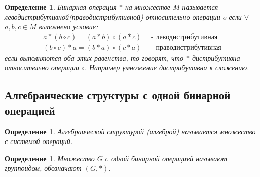 \documentclass[12pt,oneside]{article}
\newtheorem{determ}[theorem]{Определение}
\theoremstyle{definition}
\begin{document}
\begin{determ}
	Бинарная операция $*$ на множестве $M$ называется леводистрибутивной(праводистрибутивной) относительно операции $o$ если $\forall$ $a,b,c \in M$ выполнено условие:
	\begin{gather}
	a*(b \circ c) = (a*b)\circ(a*c) \quad\mbox{ - леводистрибутивная}\\
	(b \circ c)*a = (b*a)\circ(c*a) \quad\mbox{ - праводистрибутивная}
	\end{gather}
	если выполняются оба этих равенства, то говорят, что $*$ дистрибутивна относительно операции $\circ$. Например умножение дистрибутивна к сложению.
\end{determ}













































\subsection{Алгебраические структуры с одной бинарной операцией}
\begin{determ}
	Алгебраической структурой (алгеброй) называется множество с системой операций.
\end{determ}

\begin{determ}
	Множество $G$ с одной бинарной операцией называют группоидом, обозначают $(G,*)$.
\end{determ}
\end{document}
